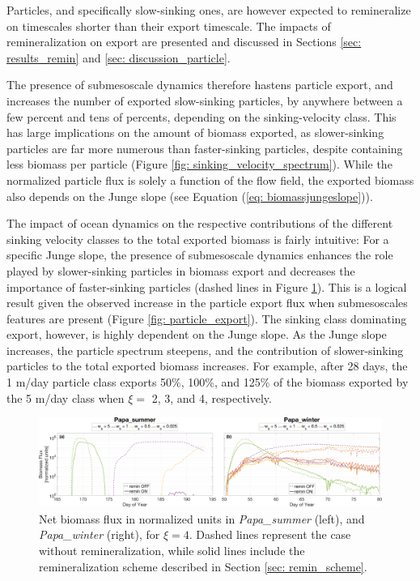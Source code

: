 \documentclass[draft,linenumbers]{agujournal2018}
\begin{document}
Particles, and specifically slow-sinking ones, are however expected to remineralize on timescales shorter than their export timescale. The impacts of remineralization on export are presented and discussed in Sections \ref{sec: results_remin} and \ref{sec: discussion_particle}.

The presence of submesoscale dynamics therefore hastens particle export, and increases the number of exported slow-sinking particles, by anywhere between a few percent and tens of percents, depending on the sinking-velocity class. This has large implications on the amount of biomass exported, as slower-sinking particles are far more numerous than faster-sinking particles, despite containing less biomass per particle (Figure \ref{fig: sinking_velocity_spectrum}). While the normalized particle flux is solely a function of the flow field, the exported biomass also depends on the Junge slope (see Equation (\ref{eq: biomassjungeslope})).

The impact of ocean dynamics on the respective contributions of the different sinking velocity classes to the total exported biomass is fairly intuitive: For a specific Junge slope, the presence of submesoscale dynamics enhances the role played by slower-sinking particles in biomass export and decreases the importance of faster-sinking particles (dashed lines in Figure \ref{fig: biomass_export_remin}). This is a logical result given the observed increase in the particle export flux when submesoscales features are present (Figure \ref{fig: particle_export}). The sinking class dominating export, however, is highly dependent on the Junge slope. As the Junge slope increases, the particle spectrum steepens, and the contribution of slower-sinking particles to the total exported biomass increases. For example, after 28 days, the 1 m/day particle class exports 50\%, 100\%, and 125\% of the biomass exported by the 5 m/day class when $\xi =$ 2, 3, and 4, respectively.

 \begin{figure}[ht]
	\centering
	\includegraphics[width = 1\linewidth]{figures/Fig7_biomass_export_flux_remin.png}
	\caption{Net biomass flux in normalized units in \textit{Papa\_summer} (left), and \textit{Papa\_winter} (right), for $\xi =4$. Dashed lines represent the case without remineralization, while solid lines include the remineralization scheme described in Section \ref{sec: remin_scheme}.}
	\label{fig: biomass_export_remin}
\end{figure}
\end{document}
